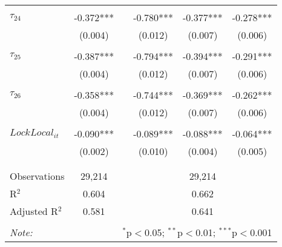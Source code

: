 \begin{tabular}{@{\extracolsep{-5pt}}lccccc}
                &           &&           &           &           \\[-2.1ex]
$\tau_{24}$     & -0.372*** && -0.780*** & -0.377*** & -0.278*** \\
                &  (0.004)  &&  (0.012)  &  (0.007)  &  (0.006)  \\
                &           &&           &           &           \\[-2.1ex]
$\tau_{25}$     & -0.387*** && -0.794*** & -0.394*** & -0.291*** \\
                &  (0.004)  &&  (0.012)  &  (0.007)  &  (0.006)  \\
                &           &&           &           &           \\[-2.1ex]
$\tau_{26}$     & -0.358*** && -0.744*** & -0.369*** & -0.262*** \\
                &  (0.004)  &&  (0.012)  &  (0.007)  &  (0.006)  \\
                &           &&           &           &           \\[-1.ex]
$LockLocal_{it}$ & -0.090*** && -0.089*** & -0.088*** & -0.064*** \\
                &  (0.002)  &&  (0.010)  &  (0.004)  &  (0.005)  \\
                &           &&           &           &           \\[-2.1ex]
\hline \\[-1.8ex] 
Observations     & 29,214 && \multicolumn{3}{c}{29,214} \\ 
R$^{2}$          &  0.604 && \multicolumn{3}{c}{0.662 } \\ 
Adjusted R$^{2}$ &  0.581 && \multicolumn{3}{c}{0.641 } \\ 
\hline 
\hline \\[-1.8ex] 
\textit{Note:}  & \multicolumn{5}{r}{$^{*}$p$<$0.05; $^{**}$p$<$0.01; $^{***}$p$<$0.001} \\ 
\end{tabular} 